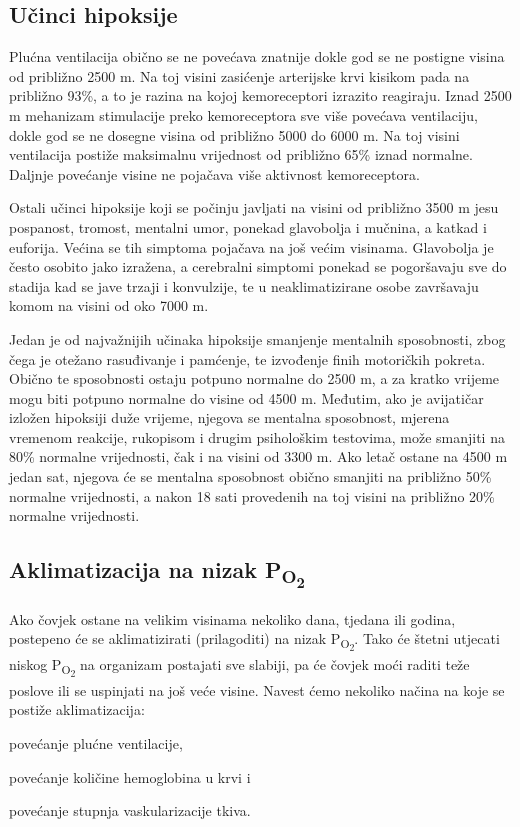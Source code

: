 \documentclass[12pt]{article}
\newcommand{\sub}[1]{\textsubscript{#1}}
\newcommand{\paro}{P\sub{O\sub{2}}}
\begin{document}
\subsection{Učinci hipoksije}

Plućna ventilacija obično se ne povećava znatnije dokle god se ne postigne
visina od približno 2500 m. Na toj visini zasićenje arterijske krvi kisikom pada
na približno 93\%, a to je razina na kojoj kemoreceptori izrazito reagiraju.
Iznad 2500 m mehanizam stimulacije preko kemoreceptora sve više povećava
ventilaciju, dokle god se ne dosegne visina od približno 5000 do 6000 m. Na toj
visini ventilacija postiže maksimalnu vrijednost od približno 65\% iznad
normalne. Daljnje povećanje visine ne pojačava više aktivnost kemoreceptora.

Ostali učinci hipoksije koji se počinju javljati na visini od približno 3500 m
jesu pospanost, tromost, mentalni umor, ponekad glavobolja i mučnina, a katkad i
euforija. Većina se tih simptoma pojačava na još većim visinama. Glavobolja je
često osobito jako izražena, a cerebralni simptomi ponekad se pogoršavaju sve do
stadija kad se jave trzaji i konvulzije, te u neaklimatizirane osobe završavaju
komom na visini od oko 7000 m.

Jedan je od najvažnijih učinaka hipoksije smanjenje mentalnih sposobnosti, zbog
čega je otežano rasuđivanje i pamćenje, te izvođenje finih motoričkih pokreta.
Obično te sposobnosti ostaju potpuno normalne do 2500 m, a za kratko vrijeme
mogu biti potpuno normalne do visine od 4500 m. Međutim, ako je avijatičar
izložen hipoksiji duže vrijeme, njegova se mentalna sposobnost, mjerena vremenom
reakcije, rukopisom i drugim psihološkim testovima, može smanjiti na 80\%
normalne vrijednosti, čak i na visini od 3300 m. Ako letač ostane na 4500 m jedan
sat, njegova će se mentalna sposobnost obično smanjiti na približno 50\%
normalne vrijednosti, a nakon 18 sati provedenih na toj visini na približno 20\%
normalne vrijednosti.

\subsection{Aklimatizacija na nizak \paro{}}

Ako čovjek ostane na velikim visinama nekoliko dana, tjedana ili godina,
postepeno će se aklimatizirati (prilagoditi) na nizak \paro{}. Tako će štetni
utjecati niskog \paro{} na organizam postajati sve slabiji, pa će čovjek moći
raditi teže poslove ili se uspinjati na još veće visine. Navest ćemo nekoliko
načina na koje se postiže aklimatizacija:
\begin{enumerate*}[label=\arabic*)]
\item povećanje plućne ventilacije, 
\item povećanje količine hemoglobina u krvi i
\item povećanje stupnja vaskularizacije tkiva.
\end{enumerate*}
\end{document}
